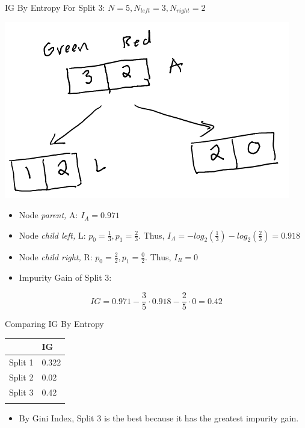 \documentclass[
  ignorenonframetext,
]{beamer}
\providecommand{\tightlist}{%
  \setlength{\itemsep}{0pt}\setlength{\parskip}{0pt}}
\begin{document}
\begin{frame}{IG By Entropy}
\label{ig-by-entropy-2}
For Split 3: \(N = 5, N_{left} =3, N_{right} = 2\)

\includegraphics{images/im2.png}

\begin{itemize}
\item
  Node \emph{parent,} A: \(I_{A} = 0.971\)
\item
  Node \emph{child left,} L: \(p_0 = \frac{1}{3}, p_1 = \frac{2}{3}\).
  Thus, \(I_{A} = -log_2(\frac{1}{3}) -log_2(\frac{2}{3}) = 0.918\)
\item
  Node \emph{child right,} R: \(p_0 = \frac{2}{2}, p_1 = \frac{0}{2}\).
  Thus, \(I_{R} = 0\)
\item
  Impurity Gain of Split 3:
\end{itemize}

\[IG = 0.971 - \frac{3}{5} \cdot 0.918 - \frac{2}{5} \cdot 0 = 0.42\]
\end{frame}

\begin{frame}{Comparing IG By Entropy}
\label{comparing-ig-by-entropy}
\begin{longtable}[]{@{}ll@{}}
\toprule\noalign{}
& IG \\
\midrule\noalign{}
\endhead
Split 1 & 0.322 \\
Split 2 & 0.02 \\
Split 3 & 0.42 \\
\bottomrule\noalign{}
\end{longtable}

\begin{itemize}
\tightlist
\item
  By Gini Index, Split 3 is the best because it has the greatest
  impurity gain.
\end{itemize}
\end{frame}
\end{document}
